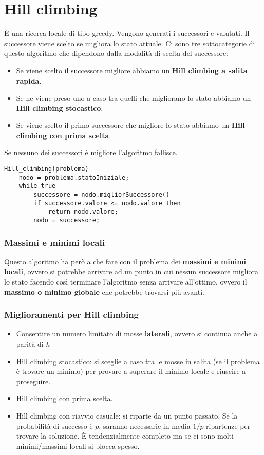 \section{Hill climbing}
\`E una ricerca locale di tipo greedy. Vengono generati i successori e valutati. Il successore
viene scelto se migliora lo stato attuale. Ci sono tre sottocategorie di questo algoritmo che
dipendono dalla modalit\`a di scelta del successore:
\begin{itemize}
	\item Se viene scelto il successore migliore abbiamo un \textbf{Hill climbing a salita rapida}.
	\item Se ne viene preso uno a caso tra quelli che migliorano lo stato abbiamo un
	      \textbf{Hill climbing stocastico}.
	\item Se viene scelto il primo successore che migliore lo stato abbiamo un
	      \textbf{Hill climbing con prima scelta}.
\end{itemize}
Se nessuno dei successori \`e migliore l'algoritmo fallisce.

\begin{lstlisting}[style=pseudo-style]
Hill_climbing(problema)
	nodo = problema.statoIniziale;
	while true
		successore = nodo.migliorSuccessore()
		if successore.valore <= nodo.valore then
			return nodo.valore;
		nodo = successore;
\end{lstlisting}

\subsubsection{Massimi e minimi locali}
Questo algoritmo ha per\`o a che fare con il problema dei \textbf{massimi e minimi locali}, ovvero
si potrebbe arrivare ad un punto in cui nessun successore migliora lo stato facendo cos\`i terminare
l'algoritmo senza arrivare all'ottimo, ovvero il \textbf{massimo o minimo globale} che potrebbe
trovarsi pi\`u avanti.

\subsubsection{Miglioramenti per Hill climbing}
\begin{itemize}
	\item Consentire un numero limitato di mosse \textbf{laterali}, ovvero si continua anche
	      a parit\`a di $h$
	\item Hill climbing stocastico: si sceglie a caso tra le mosse in salita (se il problema
	      \`e trovare un minimo) per provare a superare il minimo locale e riuscire a proseguire.
	\item Hill climbing con prima scelta.
	\item Hill climbing con riavvio casuale: si riparte da un punto passato. Se la probabilit\`a
	      di successo \`e $p$, saranno necessarie in media $1 / p$ ripartenze per trovare la soluzione.
	      \`E tendenzialmente completo ma se ci sono molti minimi/massimi locali si blocca spesso.
\end{itemize}

